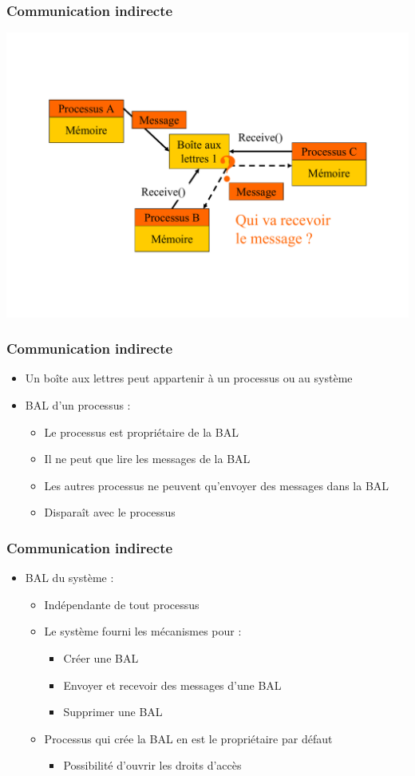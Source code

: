 \begin{frame}
\frametitle{Communication indirecte}
\includegraphics[width=.9\textwidth]{../illustration/comm_indirecte_question.pdf}
\end{frame}

\begin{frame}
\frametitle{Communication indirecte}
\begin{itemize}
\item Un boîte aux lettres peut appartenir à un processus ou au système
\item BAL d’un processus :
\begin{itemize}
\item Le processus est propriétaire de la BAL
\item Il ne peut que lire les messages de la BAL
\item Les autres processus ne peuvent qu’envoyer des messages dans la BAL
\item Disparaît avec le processus
\end{itemize}
\end{itemize}
\end{frame}

\begin{frame}
\frametitle{Communication indirecte}
\begin{itemize}
\item BAL du système :
\begin{itemize}
\item Indépendante de tout processus
\item Le système fourni les mécanismes pour :
\begin{itemize}
\item Créer une BAL
\item Envoyer et recevoir des messages d’une BAL
\item Supprimer une BAL
\end{itemize}
\item Processus qui crée la BAL en est le propriétaire par défaut
\begin{itemize}
\item Possibilité d’ouvrir les droits d’accès
\end{itemize}
\end{itemize}
\end{itemize}
\end{frame}

